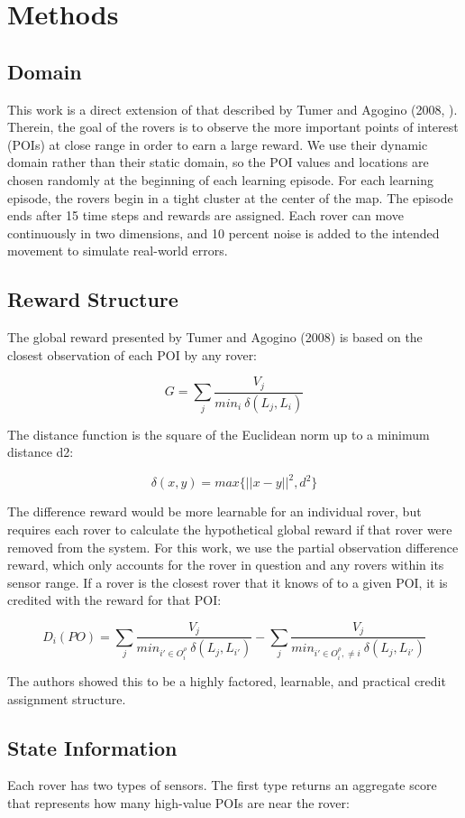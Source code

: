 \documentclass[letterpaper, 10 pt, conference]{ieeeconf}  %
\begin{document}
\section{Methods}
\subsection{Domain}
This work is a direct extension of that described by Tumer and Agogino
(2008, \cite{agogino2008analyzing}). Therein, the goal of the rovers is to observe the more
important points of interest (POIs) at close range in order to earn a
large reward. We use their dynamic domain rather than their static
domain, so the POI values and locations are chosen randomly at the
beginning of each learning episode. For each learning episode, the
rovers begin in a tight cluster at the center of the map. The episode
ends after 15 time steps and rewards are assigned. Each rover can move
continuously in two dimensions, and 10 percent noise is added to the
intended movement to simulate real-world errors.

\subsection{Reward Structure}
The global reward presented by Tumer and Agogino (2008) is based on
the closest observation of each POI by any rover:
  
\[
G= \sum_j  \frac{V_j}{min_i \: \delta(L_j, L_i)}
\]

The distance function is the square of the Euclidean norm up to a
minimum distance d2:

\[
\delta  (x,y) = max \big\{||x - y||^2, d^2 \big\}    
\]

The difference reward would be more learnable for an individual rover,
but requires each rover to calculate the hypothetical global reward if
that rover were removed from the system. For this work, we use the
partial observation difference reward, which only accounts for the
rover in question and any rovers within its sensor range. If a rover
is the closest rover that it knows of to a given POI, it is credited
with the reward for that POI:

\[
D_i(PO) = \sum_j  \frac{V_j}{min_{i' \in O^\rho_i} \: \delta(L_j, L_{i'})} - \sum_j  \frac{V_j}{min_{i' \in O^\rho_i,  \neq i} \: \delta(L_j, L_{i'})}
\]

The authors showed this to be a highly factored, learnable, and
practical credit assignment structure.

\subsection{State Information}
Each rover has two types of sensors. The first type returns an
aggregate score that represents how many high-value POIs are near the
rover:
\end{document}
